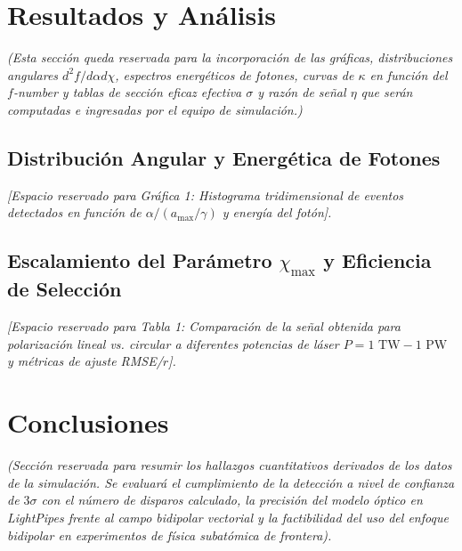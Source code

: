 \documentclass[twocolumn, 12pt]{article}
\begin{document}
\section{Resultados y Análisis}
\textit{(Esta sección queda reservada para la incorporación de las gráficas, distribuciones angulares $d^2 f / d\alpha d\chi$, espectros energéticos de fotones, curvas de $\kappa$ en función del $f$-number y tablas de sección eficaz efectiva $\sigma$ y razón de señal $\eta$ que serán computadas e ingresadas por el equipo de simulación.)}

\subsection{Distribución Angular y Energética de Fotones}
\textit{[Espacio reservado para Gráfica 1: Histograma tridimensional de eventos detectados en función de $\alpha / (a_{\text{max}}/\gamma)$ y energía del fotón].}

\subsection{Escalamiento del Parámetro $\chi_{\text{max}}$ y Eficiencia de Selección}
\textit{[Espacio reservado para Tabla 1: Comparación de la señal obtenida para polarización lineal vs. circular a diferentes potencias de láser $P = 1 \text{ TW} - 1 \text{ PW}$ y métricas de ajuste RMSE/$r$].}

\section{Conclusiones}
\textit{(Sección reservada para resumir los hallazgos cuantitativos derivados de los datos de la simulación. Se evaluará el cumplimiento de la detección a nivel de confianza de $3\sigma$ con el número de disparos calculado, la precisión del modelo óptico en LightPipes frente al campo bidipolar vectorial y la factibilidad del uso del enfoque bidipolar en experimentos de física subatómica de frontera).}
\end{document}
